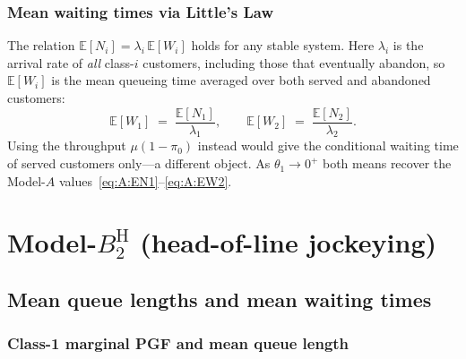 \documentclass{article}
\numberwithin{equation}{section}
\newcommand{\BH}{B_2^{\mathrm{H}}}
\begin{document}
\subsubsection*{Mean waiting times via Little's Law}

The relation $\mathbb{E}[N_i]=\lambda_i\,\mathbb{E}[W_i]$ holds for any stable system. Here $\lambda_i$ is the arrival rate of \emph{all} class-$i$ customers, including those that eventually abandon, so $\mathbb{E}[W_i]$ is the mean queueing time averaged over both served and abandoned customers:
\begin{equation*}
    \mathbb{E}[W_1] \;=\; \frac{\mathbb{E}[N_1]}{\lambda_1},
    \qquad
    \mathbb{E}[W_2] \;=\; \frac{\mathbb{E}[N_2]}{\lambda_2}.
\end{equation*}
Using the throughput $\mu(1-\pi_0)$ instead would give the conditional waiting time of served customers only---a different object. As $\theta_1\to0^+$ both means recover the Model-$A$ values~\eqref{eq:A:EN1}--\eqref{eq:A:EW2}.

\section{Model-$\BH$ (head-of-line jockeying)}

\subsection{Mean queue lengths and mean waiting times}

\subsubsection{Class-1 marginal PGF and mean queue length}
\end{document}
